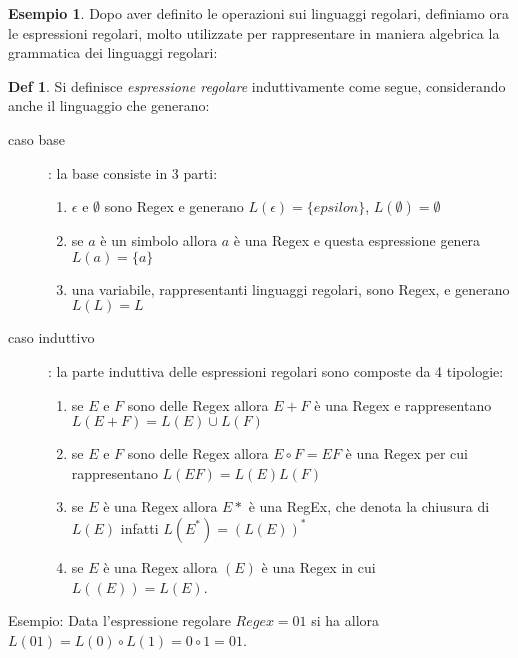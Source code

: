 \documentclass[a4paper]{book}
\theoremstyle{definition}%
\newtheorem*{defi}{Def}%
\newtheorem*{esempio}{Esempio}
\begin{document}
\begin{esempio}
  Dopo aver definito le operazioni sui linguaggi regolari, definiamo ora le espressioni regolari, molto utilizzate per rappresentare in
  maniera algebrica la grammatica dei linguaggi regolari:
\begin{defi}
Si definisce \emph{espressione regolare} induttivamente come segue, considerando anche il linguaggio che generano:
   \begin{description}
   \item [caso base]: la base consiste in 3 parti:
        \begin{enumerate}
        \item $\epsilon$ e $\emptyset$ sono Regex e generano $L(\epsilon) = \{epsilon\}$, $L(\emptyset) = \emptyset$
        \item se $a$ è un simbolo allora $a$ è una Regex e questa espressione genera $L(a) = \{a\}$
        \item una variabile, rappresentanti linguaggi regolari, sono Regex, e generano $L(L) = L$
        \end{enumerate}

   \item [caso induttivo]: la parte induttiva delle espressioni regolari sono composte da 4 tipologie:
        \begin{enumerate}
        \item se $E$ e $F$ sono delle Regex allora $E + F$ è una Regex e rappresentano $L(E + F) = L(E) \cup L(F)$
        \item se $E$ e $F$ sono delle Regex allora $E \circ F = EF$ è una Regex per cui rappresentano $L(EF) = L(E)L(F)$
        \item se $E$ è una Regex allora $E*$ è una RegEx, che denota la chiusura di $L(E)$ infatti $L(E^*) = (L(E))^*$
        \item se $E$ è una Regex allora $(E)$ è una Regex in cui $L((E)) = L(E)$.
        \end{enumerate}
  \end{description}
\end{defi}

Esempio: Data l'espressione regolare $Regex = 01$ si ha allora $L(01) = L(0) \circ L(1) = 0 \circ 1 = 01$.


\end{esempio}
\end{document}
